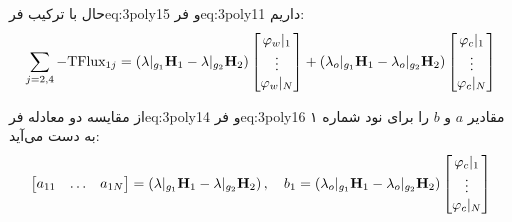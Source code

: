 حال با ترکیب ‌فر{eq:3poly15} و  ‌فر{eq:3poly11} داریم:
\begin{equation}
\label{eq:3poly16}
\sum_{j=2,4} -\text{TFlux}_{1j} = 
\left( \lambda|_{g_1} \textbf H_1 - \lambda|_{g_2} \textbf H_2 \right)
\begin{bmatrix}
	\varphi_w|_1 \\ \vdots \\ \varphi_w|_N
\end{bmatrix}
+
\left( \lambda_o|_{g_1} \textbf H_1 - \lambda_o|_{g_2} \textbf H_2 \right)
\begin{bmatrix}
	\varphi_c|_1 \\ \vdots \\ \varphi_c|_N
\end{bmatrix}
\end{equation}

از مقایسه دو معادله ‌فر{eq:3poly14} و  ‌فر{eq:3poly16} مقادیر $a$ و $b$ را برای نود شماره ۱ به دست می‌آید:
\begin{equation}
\label{eq:3poly17}
\begin{bmatrix}
	a_{11} &\ldots &a_{1N} 
\end{bmatrix} 
=  \left( \lambda|_{g_1} \textbf H_1 - \lambda|_{g_2} \textbf H_2 \right) , \quad 
b_1 = 
\left( \lambda_o|_{g_1} \textbf H_1 - \lambda_o|_{g_2} \textbf H_2 \right)
\begin{bmatrix}
	\varphi_c|_1 \\ \vdots \\ \varphi_c|_N
\end{bmatrix}
\end{equation}

